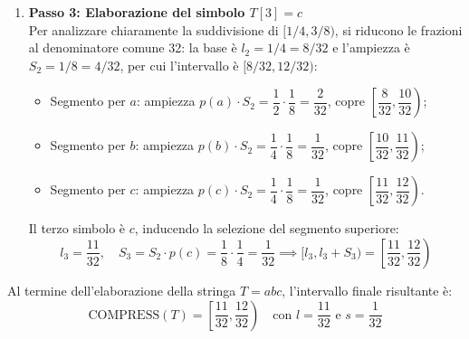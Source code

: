 \begin{enumerate}
  \item \textbf{Passo 3: Elaborazione del simbolo $T[3] = c$}\\
  Per analizzare chiaramente la suddivisione di $[1/4, 3/8)$, si riducono le frazioni al denominatore comune 32: la base \`e $l_2 = 1/4 = 8/32$ e l'ampiezza \`e $S_2 = 1/8 = 4/32$, per cui l'intervallo \`e $[8/32, 12/32)$:
  \begin{itemize}
    \item Segmento per $a$: ampiezza $p(a) \cdot S_2 = \dfrac{1}{2} \cdot \dfrac{1}{8} = \dfrac{2}{32}$, copre $\left[\dfrac{8}{32}, \dfrac{10}{32}\right)$;
    \item Segmento per $b$: ampiezza $p(b) \cdot S_2 = \dfrac{1}{4} \cdot \dfrac{1}{8} = \dfrac{1}{32}$, copre $\left[\dfrac{10}{32}, \dfrac{11}{32}\right)$;
    \item Segmento per $c$: ampiezza $p(c) \cdot S_2 = \dfrac{1}{4} \cdot \dfrac{1}{8} = \dfrac{1}{32}$, copre $\left[\dfrac{11}{32}, \dfrac{12}{32}\right)$.
  \end{itemize}
  Il terzo simbolo \`e $c$, inducendo la selezione del segmento superiore:
  \begin{equation}
    l_3 = \frac{11}{32}, \quad S_3 = S_2 \cdot p(c) = \frac{1}{8} \cdot \frac{1}{4} = \frac{1}{32} \implies [l_3, l_3 + S_3) = \left[\frac{11}{32}, \frac{12}{32}\right)
  \end{equation}
\end{enumerate}

Al termine dell'elaborazione della stringa $T = abc$, l'intervallo finale risultante \`e:
\begin{equation}
  \text{COMPRESS}(T) = \left[ \frac{11}{32}, \frac{12}{32} \right) \quad \text{con } l = \frac{11}{32} \text{ e } s = \frac{1}{32}
\end{equation}

